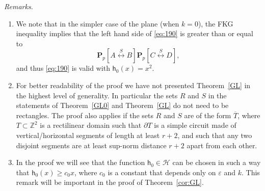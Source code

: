\documentclass[12pt, twoside,a4paper,reqno]{amsart}
\theoremstyle{plain}
\theoremstyle{remark}
\theoremstyle{definition}
\newcommand{\eps}{\varepsilon}
\newcommand{\lr}[1][]{\overset{\:#1\:}\longleftrightarrow}
\newcommand{\ol}{\overline}
\begin{document}
\noindent\textit{Remarks.}
\begin{enumerate}[1.]
\item We note that in the simpler case of the plane (when $k = 0$), the FKG
  inequality implies that the left hand side of \eqref{eq:190} is greater than
  or equal to
\[ \mathbf{P}_{p}\left[ A\lr[S]B\right] \mathbf{P}_{p}\left[  C\lr[S]D\right], \]
 and thus
  \eqref{eq:190} is valid with $\mathsf{h}_0(x) = x^{2}$.
\item\label{item:6} For better readability of the proof we have not presented \mbox{Theorem
    \ref{GL}} in the highest level of generality. In particular the sets $R$ and
  $S$ in the statements of Theorem~\ref{GL0} and Theorem~\ref{GL} do not need
  to be rectangles. The proof also applies if the sets $R$ and $S$ are of the
  form $\ol{T}$, where $T\subset \mathbb Z^2$ is a rectilinear domain such that $\partial T$ is a simple circuit made of 
 vertical/horizontal segments of length at least $ r+2$, and such that any two disjoint segments are at least sup-norm 
distance $r+2$ apart from each other.

\item In the proof we will see that the function $\mathsf h_0\in\mathcal H$ can be chosen in
  such a way that $\mathsf h_0(x)\ge c_0 x$, where $c_0$ is a constant that
  depends only on $\eps$ and $k$. This remark will be important in the
  proof of Theorem~\ref{cor:GL}.
\end{enumerate}
\end{document}
